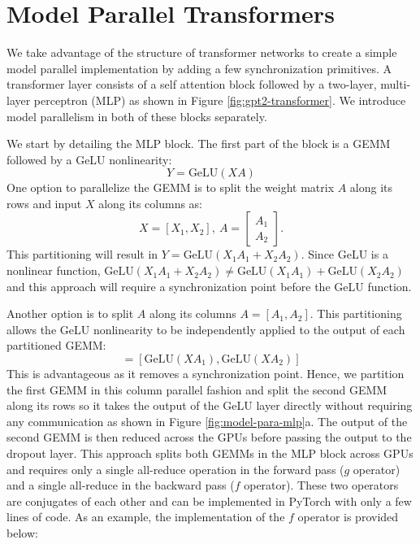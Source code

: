 \documentclass{article}
\begin{document}
\section{Model Parallel Transformers} 
\label{model_par}

We take advantage of the structure of transformer networks to create a simple model parallel implementation by adding a few synchronization primitives. A transformer layer consists of a self attention block followed by a two-layer, multi-layer perceptron (MLP) as shown in Figure \ref{fig:gpt2-transformer}. We introduce model parallelism in both of these blocks separately.

 We start by detailing the MLP block. The first part of the block is a GEMM followed by a GeLU nonlinearity:
 \begin{equation}
    Y = \textrm{GeLU}(XA)
    \label{eq:mlp-firstgemm}
 \end{equation}
 One option to parallelize the GEMM is to split the weight matrix $A$ along its rows and input $X$ along its columns as:
 \begin{equation}
    X = [X_1, X_2], \
    A=\begin{bmatrix}
        A_1 \\
        A_2
    \end{bmatrix}.
 \end{equation}
 This partitioning will result in $Y = \textrm{GeLU}(X_1A_1 + X_2A_2)$. Since GeLU is a nonlinear function, $\textrm{GeLU}(X_1A_1 + X_2A_2)\neq \textrm{GeLU}(X_1A_1)+\textrm{GeLU}(X_2A_2)$ and this approach will require a synchronization point before the GeLU function. 
 
 Another option is to split $A$ along its columns $A=[A_1, A_2]$. This partitioning allows the GeLU nonlinearity to be independently applied to the output of each partitioned GEMM:
 \begin{equation}
    [Y_1, Y_2]= [\textrm{GeLU}(XA_1), \textrm{GeLU}(XA_2)] 
 \end{equation}
 This is advantageous as it removes a synchronization point. Hence, we partition the first GEMM in this column parallel fashion and split the second GEMM along its rows so it takes the output of the GeLU layer directly without requiring any communication as shown in Figure \ref{fig:model-para-mlp}a. The output of the second GEMM is then reduced across the GPUs before passing the output to the dropout layer. This approach splits both GEMMs in the MLP block across GPUs and requires only a single all-reduce operation in the forward pass ($g$ operator) and a single all-reduce in the backward pass ($f$ operator). These two operators are conjugates of each other and can be implemented in PyTorch with only a few lines of code. As an example, the implementation of the $f$ operator is provided below:
\end{document}
